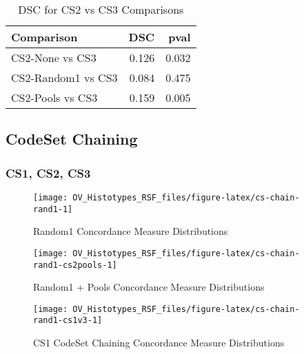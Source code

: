 \documentclass[
]{report}
\begin{document}
\begin{table}

\caption{\label{tab:cs23-dsc}DSC for CS2 vs CS3 Comparisons}
\centering
\begin{tabular}[t]{l|r|r}
\hline
Comparison & DSC & pval\\
\hline
CS2-None vs CS3 & 0.126 & 0.032\\
\hline
CS2-Random1 vs CS3 & 0.084 & 0.475\\
\hline
CS2-Pools vs CS3 & 0.159 & 0.005\\
\hline
\end{tabular}
\end{table}

\hypertarget{codeset-chaining}{%
\subsection{CodeSet Chaining}\label{codeset-chaining}}

\hypertarget{cs1-cs2-cs3}{%
\subsubsection{CS1, CS2, CS3}\label{cs1-cs2-cs3}}

\begin{figure}[H]

{\centering \texttt{[image: OV\_Histotypes\_RSF\_files/figure-latex/cs-chain-rand1-1]} 

}

\caption{Random1 Concordance Measure Distributions}\label{fig:cs-chain-rand1}
\end{figure}

\begin{figure}[H]

{\centering \texttt{[image: OV\_Histotypes\_RSF\_files/figure-latex/cs-chain-rand1-cs2pools-1]} 

}

\caption{Random1 + Pools Concordance Measure Distributions}\label{fig:cs-chain-rand1-cs2pools}
\end{figure}

\begin{figure}[H]

{\centering \texttt{[image: OV\_Histotypes\_RSF\_files/figure-latex/cs-chain-rand1-cs1v3-1]} 

}

\caption{CS1 CodeSet Chaining Concordance Measure Distributions}\label{fig:cs-chain-rand1-cs1v3}
\end{figure}
\end{document}
